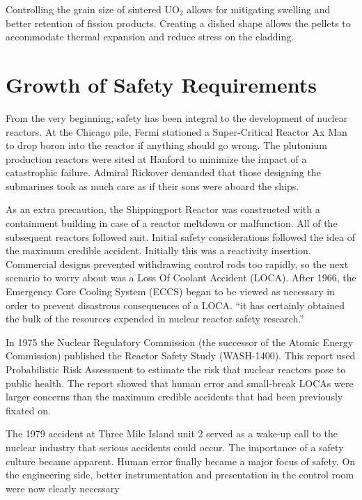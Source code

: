 Controlling the grain size of sintered UO$_2$ allows for mitigating swelling and better retention of fission products. Creating a dished shape allows the pellets to accommodate thermal expansion and reduce stress on the cladding.  


\section{Growth of Safety Requirements}
From the very beginning, safety has been integral to the development of nuclear reactors. At the Chicago pile, Fermi stationed a Super-Critical Reactor Ax Man to drop boron into the reactor if anything should go wrong.
The plutonium production reactors were sited at Hanford to minimize the impact of a catastrophic failure.
Admiral Rickover demanded that those designing the submarines took as much care as if their sons were aboard the ships.

As an extra precaution, the Shippingport Reactor was constructed with a containment building in case of a reactor meltdown or malfunction. All of the subsequent reactors followed suit. 
Initial safety considerations followed the idea of the maximum credible accident. Initially this was a reactivity insertion. Commercial designs prevented withdrawing control rods too rapidly, so the next scenario to worry about was a Loss Of Coolant Accident (LOCA).
After 1966, the Emergency Core Cooling System (ECCS) began to be viewed as necessary in order to prevent disastrous consequences of a LOCA.  ``it has certainly obtained the bulk of the resources expended in nuclear reactor safety research.''\cite{Safety_website}

In 1975 the Nuclear Regulatory Commission (the successor of the Atomic Energy Commission) published the Reactor Safety Study (WASH-1400). This report used Probabilistic Risk Assessment to estimate the risk that nuclear reactors pose to public health. The report showed that human error and small-break LOCAs were larger concerns than the maximum credible accidents that had been previously fixated on.

The 1979 accident at Three Mile Island unit 2 served as a wake-up call to the nuclear industry that serious accidents could occur. The importance of a safety culture became apparent. Human error finally became a major focus of safety. On the engineering side, better instrumentation and presentation in the control room were now clearly necessary

